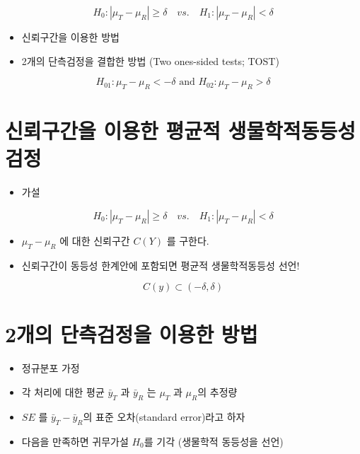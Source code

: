 \documentclass[
]{book}
\providecommand{\tightlist}{%
  \setlength{\itemsep}{0pt}\setlength{\parskip}{0pt}}
\begin{document}
\[ H_0: |\mu_T-\mu_R| \ge \delta  \quad vs. \quad H_1: |\mu_T-\mu_R| < \delta \]

\begin{itemize}
\item
  신뢰구간을 이용한 방법
\item
  2개의 단측검정을 결합한 방법 (Two ones-sided tests; TOST)
\end{itemize}

\[ H_{01}: \mu_T-\mu_R  < -\delta \text{ and } H_{02}:  \mu_T-\mu_R  > \delta \]

\hypertarget{uxc2e0uxb8b0uxad6cuxac04uxc744-uxc774uxc6a9uxd55c-uxd3c9uxade0uxc801-uxc0dduxbb3cuxd559uxc801uxb3d9uxb4f1uxc131-uxac80uxc815}{%
\section{신뢰구간을 이용한 평균적 생물학적동등성 검정}\label{uxc2e0uxb8b0uxad6cuxac04uxc744-uxc774uxc6a9uxd55c-uxd3c9uxade0uxc801-uxc0dduxbb3cuxd559uxc801uxb3d9uxb4f1uxc131-uxac80uxc815}}

\begin{itemize}
\tightlist
\item
  가설
\end{itemize}

\[ H_0: |\mu_T-\mu_R| \ge \delta  \quad vs. \quad H_1: |\mu_T-\mu_R| < \delta \]

\begin{itemize}
\item
  \(\mu_T-\mu_R\) 에 대한 신뢰구간 \(C(Y)\) 를 구한다.
\item
  신뢰구간이 동등성 한계안에 포함되면 평균적 생물학적동등성 선언!
\end{itemize}

\[ C(y) \subset (-\delta,\delta) \]

\hypertarget{uxac1cuxc758-uxb2e8uxce21uxac80uxc815uxc744-uxc774uxc6a9uxd55c-uxbc29uxbc95}{%
\section{2개의 단측검정을 이용한 방법}\label{uxac1cuxc758-uxb2e8uxce21uxac80uxc815uxc744-uxc774uxc6a9uxd55c-uxbc29uxbc95}}

\begin{itemize}
\item
  정규분포 가정
\item
  각 처리에 대한 평균 \(\bar {y}_T\) 과 \(\bar {y}_R\) 는 \(\mu_T\) 과 \(\mu_R\)의 추정량
\item
  \(SE\) 를 \(\bar {y}_T-\bar {y}_R\)의 표준 오차(standard error)라고 하자
\item
  다음을 만족하면 귀무가설 \(H_0\)를 기각 (생물학적 동등성을 선언)
\end{itemize}
\end{document}

